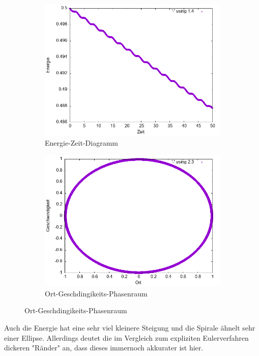 \documentclass[
    oneside,
    ngerman,
    footinclude=false,
    captions=tableheading,
    DIV=12
]{scrartcl}
\begin{document}
            \begin{figure}[H]
            \centering
            \begin{subfigure}[b]{0.45\textwidth}
                \centering
                \includegraphics[width=\textwidth]{Bilddateien/LLA1(a)-0001-E.png}
                \caption{Energie-Zeit-Diagramm}
                \label{fig:LLA1(a)-0001-0-E}
            \end{subfigure}
            \hfill
            \begin{subfigure}[b]{0.45\textwidth}
                \centering
                \includegraphics[width=\textwidth]{Bilddateien/LLA1(a)-0001-0-xv.png}
                \caption{Ort-Geschdingikeits-Phasenraum}
                \label{fig:LLA1(a)-0001-0-xv}
            \end{subfigure}
            \end{figure}
            Auch die Energie hat eine sehr viel kleinere Steigung und die Spirale ähnelt sehr einer Ellipse. Allerdings deutet die im Vergleich zum expliziten Eulerverfahren dickeren "Ränder" an, dass dieses immernoch akkurater ist hier.
\end{document}

